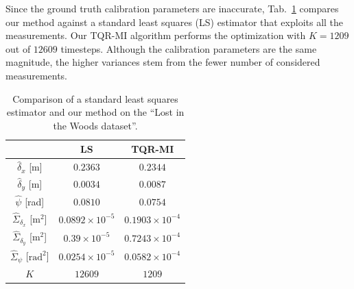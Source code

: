 Since the ground truth calibration parameters are inaccurate,
Tab.~\ref{tab:dataset2-comp} compares our method against a standard
least squares (LS) estimator that exploits all the measurements. Our TQR-MI
algorithm performs the optimization with $K=1209$ out of $12609$ timesteps.
Although the calibration parameters are the same magnitude, the higher variances
stem from the fewer number of considered measurements.

\begin{table}[!t]
\renewcommand{\arraystretch}{1.3}
\caption{Comparison of a standard least squares estimator and our
  method on the ``Lost in the Woods dataset''.}
\label{tab:dataset2-comp}
\centering
\begin{tabular}{c||c||c}
\hline
& \bfseries LS & \bfseries TQR-MI\\
\hline\hline
$\hat{\delta}_x$ [m] & $0.2363$ & $0.2344$\\
\hline
$\hat{\delta}_y$ [m]& $0.0034$ & $0.0087$\\
\hline
$\hat{\psi}$ [rad] & $0.0810$ & $0.0754$\\
\hline
$\hat{\Sigma}_{\delta_x}$ [$\text{m}^2$] & $0.0892\times 10^{-5}$ &
  $0.1903\times 10^{-4}$\\
\hline
$\hat{\Sigma}_{\delta_y}$ [$\text{m}^2$] & $0.39\times 10^{-5}$ &
  $0.7243\times 10^{-4}$\\
\hline
$\hat{\Sigma}_{\psi}$ [$\text{rad}^2$] & $0.0254\times 10^{-5}$ &
  $0.0582\times 10^{-4}$\\
\hline
$K$ & $12609$ & $1209$\\
\hline
\end{tabular}
\end{table}
